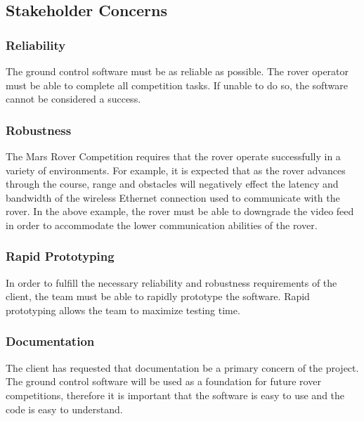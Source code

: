 \subsection{Stakeholder Concerns}
\subsubsection{Reliability}
The ground control software must be as reliable as possible.
The rover operator must be able to complete all competition tasks.
If unable to do so, the software cannot be considered a success.
\subsubsection{Robustness}
The Mars Rover Competition requires that the rover operate successfully in a variety of environments.
For example, it is expected that as the rover advances through the course, range and obstacles will negatively effect the latency and bandwidth of the wireless Ethernet connection used to communicate with the rover.
In the above example, the rover must be able to downgrade the video feed in order to accommodate the lower communication abilities of the rover.
\subsubsection{Rapid Prototyping}
In order to fulfill the necessary reliability and robustness requirements of the client, the team must be able to rapidly prototype the software.
Rapid prototyping allows the team to maximize testing time.
\subsubsection{Documentation}
The client has requested that documentation be a primary concern of the project.
The ground control software will be used as a foundation for future rover competitions, therefore it is important that the software is easy to use and the code is easy to understand.